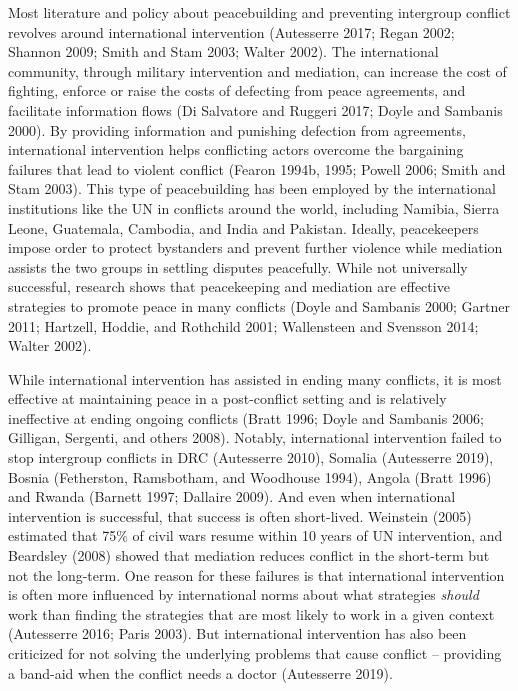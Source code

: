 \documentclass[11pt]{article}
\begin{document}
Most literature and policy about peacebuilding and preventing intergroup
conflict revolves around international intervention (Autesserre 2017;
Regan 2002; Shannon 2009; Smith and Stam 2003; Walter 2002). The
international community, through military intervention and mediation,
can increase the cost of fighting, enforce or raise the costs of
defecting from peace agreements, and facilitate information flows (Di
Salvatore and Ruggeri 2017; Doyle and Sambanis 2000). By providing
information and punishing defection from agreements, international
intervention helps conflicting actors overcome the bargaining failures
that lead to violent conflict (Fearon 1994b, 1995; Powell 2006; Smith
and Stam 2003). This type of peacebuilding has been employed by the
international institutions like the UN in conflicts around the world,
including Namibia, Sierra Leone, Guatemala, Cambodia, and India and
Pakistan. Ideally, peacekeepers impose order to protect bystanders and
prevent further violence while mediation assists the two groups in
settling disputes peacefully. While not universally successful, research
shows that peacekeeping and mediation are effective strategies to
promote peace in many conflicts (Doyle and Sambanis 2000; Gartner 2011;
Hartzell, Hoddie, and Rothchild 2001; Wallensteen and Svensson 2014;
Walter 2002).

While international intervention has assisted in ending many conflicts,
it is most effective at maintaining peace in a post-conflict setting and
is relatively ineffective at ending ongoing conflicts (Bratt 1996; Doyle
and Sambanis 2006; Gilligan, Sergenti, and others 2008). Notably,
international intervention failed to stop intergroup conflicts in DRC
(Autesserre 2010), Somalia (Autesserre 2019), Bosnia (Fetherston,
Ramsbotham, and Woodhouse 1994), Angola (Bratt 1996) and Rwanda (Barnett
1997; Dallaire 2009). And even when international intervention is
successful, that success is often short-lived. Weinstein (2005)
estimated that 75\% of civil wars resume within 10 years of UN
intervention, and Beardsley (2008) showed that mediation reduces
conflict in the short-term but not the long-term. One reason for these
failures is that international intervention is often more influenced by
international norms about what strategies \emph{should} work than
finding the strategies that are most likely to work in a given context
(Autesserre 2016; Paris 2003). But international intervention has also
been criticized for not solving the underlying problems that cause
conflict -- providing a band-aid when the conflict needs a doctor
(Autesserre 2019).
\end{document}
